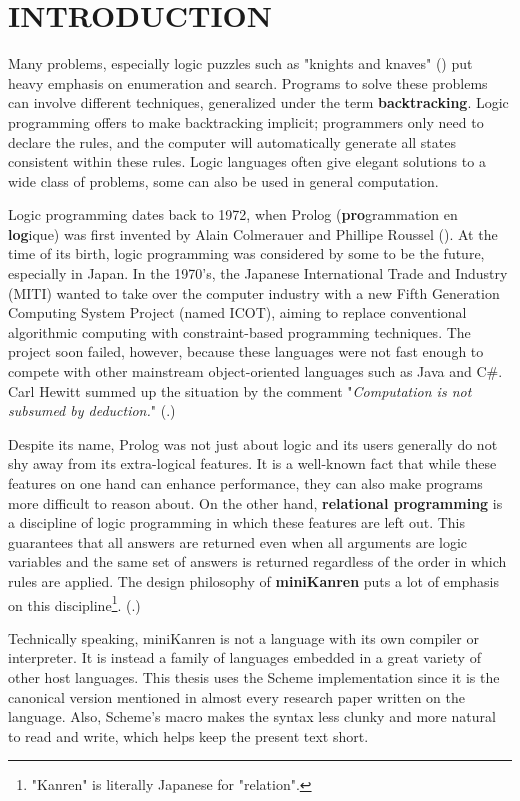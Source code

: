 \section{INTRODUCTION}
Many problems, especially logic puzzles such as "knights and knaves" (\cite{knight}) put heavy emphasis on enumeration and search. Programs to solve these problems can involve different techniques, generalized under the term \textbf{backtracking}. Logic programming offers to make backtracking implicit; programmers only need to declare the rules, and the computer will automatically generate all states consistent within these rules. Logic languages often give elegant solutions to a wide class of problems, some can also be used in general computation.

Logic programming dates back to 1972, when Prolog (\textbf{pro}grammation en \textbf{log}ique) was first invented by Alain Colmerauer and Phillipe Roussel (\cite{early-prolog}). At the time of its birth, logic programming was considered by some to be the future, especially in Japan. In the 1970's, the Japanese International Trade and Industry (MITI) wanted to take over the computer industry with a new Fifth Generation Computing System Project (named ICOT), aiming to replace conventional algorithmic computing with constraint-based programming techniques. The project soon failed, however, because these languages were not fast enough to compete with other mainstream object-oriented languages such as Java and C\#. Carl Hewitt summed up the situation by the comment "\textit{Computation is not subsumed by deduction.}" (\cite{logic-fail}.)

Despite its name, Prolog was not just about logic and its users generally do not shy away from its extra-logical features. It is a well-known fact that while these features on one hand can enhance performance, they can also make programs more difficult to reason about. On the other hand, \textbf{relational programming} is a discipline of logic programming in which these features are left out. This guarantees that all answers are returned even when all arguments are logic variables and the same set of answers is returned regardless of the order in which rules are applied. The design philosophy of \textbf{miniKanren} puts a lot of emphasis on this discipline\footnote{"Kanren" is literally Japanese for "relation".}. (\cite{byrdphd}.)

Technically speaking, miniKanren is not a language with its own compiler or interpreter. It is instead a family of languages embedded in a great variety of other host languages. This thesis uses the Scheme implementation since it is the canonical version mentioned in almost every research paper written on the language. Also, Scheme's macro makes the syntax less clunky and more natural to read and write, which helps keep the present text short.

